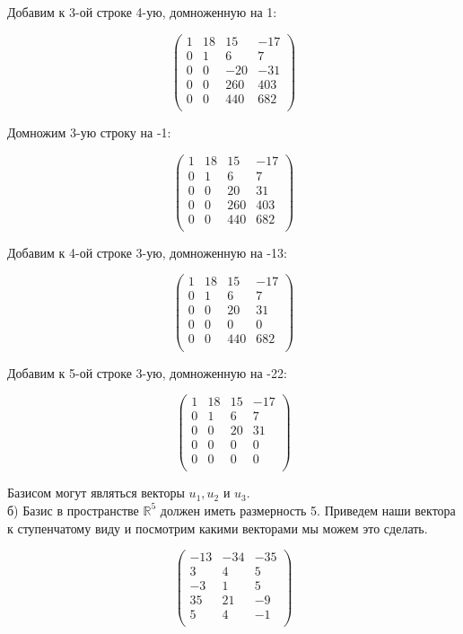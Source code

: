 	Добавим к 3-ой строке 4-ую, домноженную на 1:
	
	\[
	\begin{pmatrix}
	1 & 18 & 15 & -17 \\
	0 & 1 & 6 & 7 \\
	0 & 0 & -20 & -31 \\
	0 & 0 & 260 & 403 \\
	0 & 0 & 440 & 682 \\
	\end{pmatrix}
	\]
	
	Домножим 3-ую строку на -1:
	
	\[
	\begin{pmatrix}
	1 & 18 & 15 & -17 \\
	0 & 1 & 6 & 7 \\
	0 & 0 & 20 & 31 \\
	0 & 0 & 260 & 403 \\
	0 & 0 & 440 & 682 \\
	\end{pmatrix}
	\]
	
	Добавим к 4-ой строке 3-ую, домноженную на -13:
	
	\[
	\begin{pmatrix}
	1 & 18 & 15 & -17 \\
	0 & 1 & 6 & 7 \\
	0 & 0 & 20 & 31 \\
	0 & 0 & 0 & 0 \\
	0 & 0 & 440 & 682 \\
	\end{pmatrix}
	\]
	
	Добавим к 5-ой строке 3-ую, домноженную на -22:
	
	\[
	\begin{pmatrix}
	1 & 18 & 15 & -17 \\
	0 & 1 & 6 & 7 \\
	0 & 0 & 20 & 31 \\
	0 & 0 & 0 & 0 \\
	0 & 0 & 0 & 0 \\
	\end{pmatrix}
	\]
	
	Базисом могут являться векторы $u_1, u_2$ и $u_3$.\\
	
	б) Базис в пространстве $\mathbb{R}^5$ должен иметь размерность 5. Приведем наши вектора к ступенчатому виду и посмотрим какими векторами мы можем это сделать.
	
	\[
	\begin{pmatrix}
	-13 & -34 & -35 \\
	3 & 4 & 5 \\
	-3 & 1 & 5 \\
	35 & 21 & -9 \\
	5 & 4 & -1 \\
	\end{pmatrix}
	\]
	
